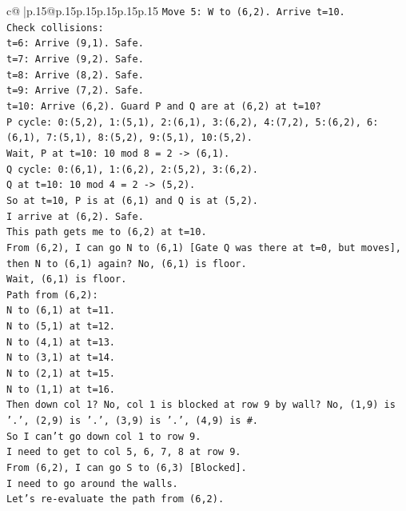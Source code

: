 \documentclass{article}
\begin{document}
{\begin{supertabular}{c@{$\;$}|p{.15\linewidth}@{}p{.15\linewidth}p{.15\linewidth}p{.15\linewidth}p{.15\linewidth}p{.15\linewidth}}
{{{\texttt{Move 5: W to (6,2). Arrive t=10.} \\
\texttt{Check collisions:} \\
\texttt{t=6: Arrive (9,1). Safe.} \\
\texttt{t=7: Arrive (9,2). Safe.} \\
\texttt{t=8: Arrive (8,2). Safe.} \\
\texttt{t=9: Arrive (7,2). Safe.} \\
\texttt{t=10: Arrive (6,2). Guard P and Q are at (6,2) at t=10?} \\
\texttt{P cycle: 0:(5,2), 1:(5,1), 2:(6,1), 3:(6,2), 4:(7,2), 5:(6,2), 6:(6,1), 7:(5,1), 8:(5,2), 9:(5,1), 10:(5,2).} \\
\texttt{Wait, P at t=10: 10 mod 8 = 2 {-}> (6,1).} \\
\texttt{Q cycle: 0:(6,1), 1:(6,2), 2:(5,2), 3:(6,2).} \\
\texttt{Q at t=10: 10 mod 4 = 2 {-}> (5,2).} \\
\texttt{So at t=10, P is at (6,1) and Q is at (5,2).} \\
\texttt{I arrive at (6,2). Safe.} \\
\texttt{This path gets me to (6,2) at t=10.} \\
\texttt{From (6,2), I can go N to (6,1) {[}Gate Q was there at t=0, but moves{]}, then N to (6,1) again? No, (6,1) is floor.} \\
\texttt{Wait, (6,1) is floor.} \\
\texttt{Path from (6,2):} \\
\texttt{N to (6,1) at t=11.} \\
\texttt{N to (5,1) at t=12.} \\
\texttt{N to (4,1) at t=13.} \\
\texttt{N to (3,1) at t=14.} \\
\texttt{N to (2,1) at t=15.} \\
\texttt{N to (1,1) at t=16.} \\
\texttt{Then down col 1? No, col 1 is blocked at row 9 by wall? No, (1,9) is '.', (2,9) is '.', (3,9) is '.', (4,9) is \#.} \\
\texttt{So I can't go down col 1 to row 9.} \\
\texttt{I need to get to col 5, 6, 7, 8 at row 9.} \\
\texttt{From (6,2), I can go S to (6,3) {[}Blocked{]}.} \\
\texttt{I need to go around the walls.} \\
\texttt{Let's re{-}evaluate the path from (6,2).} \\
}}}
\end{supertabular}}
\end{document}
